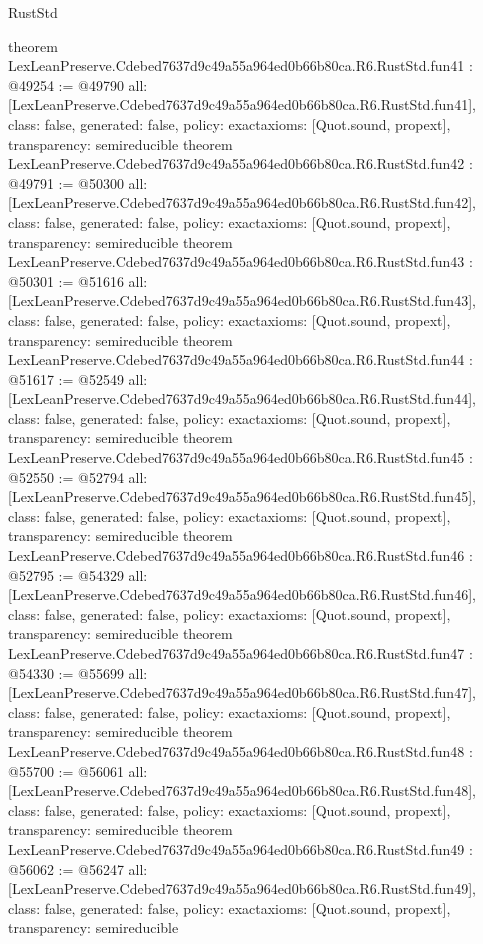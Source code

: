 \begin{lexlean}{RustStd}
\begin{coremodule}
{}
theorem LexLeanPreserve.Cdebed7637d9c49a55a964ed0b66b80ca.R6.RustStd.fun41 : @49254 := @49790 {
  all: [LexLeanPreserve.Cdebed7637d9c49a55a964ed0b66b80ca.R6.RustStd.fun41],
  class: false,
  generated: false,
  policy: exact{axioms: [Quot.sound, propext]},
  transparency: semireducible
}
theorem LexLeanPreserve.Cdebed7637d9c49a55a964ed0b66b80ca.R6.RustStd.fun42 : @49791 := @50300 {
  all: [LexLeanPreserve.Cdebed7637d9c49a55a964ed0b66b80ca.R6.RustStd.fun42],
  class: false,
  generated: false,
  policy: exact{axioms: [Quot.sound, propext]},
  transparency: semireducible
}
theorem LexLeanPreserve.Cdebed7637d9c49a55a964ed0b66b80ca.R6.RustStd.fun43 : @50301 := @51616 {
  all: [LexLeanPreserve.Cdebed7637d9c49a55a964ed0b66b80ca.R6.RustStd.fun43],
  class: false,
  generated: false,
  policy: exact{axioms: [Quot.sound, propext]},
  transparency: semireducible
}
theorem LexLeanPreserve.Cdebed7637d9c49a55a964ed0b66b80ca.R6.RustStd.fun44 : @51617 := @52549 {
  all: [LexLeanPreserve.Cdebed7637d9c49a55a964ed0b66b80ca.R6.RustStd.fun44],
  class: false,
  generated: false,
  policy: exact{axioms: [Quot.sound, propext]},
  transparency: semireducible
}
theorem LexLeanPreserve.Cdebed7637d9c49a55a964ed0b66b80ca.R6.RustStd.fun45 : @52550 := @52794 {
  all: [LexLeanPreserve.Cdebed7637d9c49a55a964ed0b66b80ca.R6.RustStd.fun45],
  class: false,
  generated: false,
  policy: exact{axioms: [Quot.sound, propext]},
  transparency: semireducible
}
theorem LexLeanPreserve.Cdebed7637d9c49a55a964ed0b66b80ca.R6.RustStd.fun46 : @52795 := @54329 {
  all: [LexLeanPreserve.Cdebed7637d9c49a55a964ed0b66b80ca.R6.RustStd.fun46],
  class: false,
  generated: false,
  policy: exact{axioms: [Quot.sound, propext]},
  transparency: semireducible
}
theorem LexLeanPreserve.Cdebed7637d9c49a55a964ed0b66b80ca.R6.RustStd.fun47 : @54330 := @55699 {
  all: [LexLeanPreserve.Cdebed7637d9c49a55a964ed0b66b80ca.R6.RustStd.fun47],
  class: false,
  generated: false,
  policy: exact{axioms: [Quot.sound, propext]},
  transparency: semireducible
}
theorem LexLeanPreserve.Cdebed7637d9c49a55a964ed0b66b80ca.R6.RustStd.fun48 : @55700 := @56061 {
  all: [LexLeanPreserve.Cdebed7637d9c49a55a964ed0b66b80ca.R6.RustStd.fun48],
  class: false,
  generated: false,
  policy: exact{axioms: [Quot.sound, propext]},
  transparency: semireducible
}
theorem LexLeanPreserve.Cdebed7637d9c49a55a964ed0b66b80ca.R6.RustStd.fun49 : @56062 := @56247 {
  all: [LexLeanPreserve.Cdebed7637d9c49a55a964ed0b66b80ca.R6.RustStd.fun49],
  class: false,
  generated: false,
  policy: exact{axioms: [Quot.sound, propext]},
  transparency: semireducible
}
\end{coremodule}
\end{lexlean}
